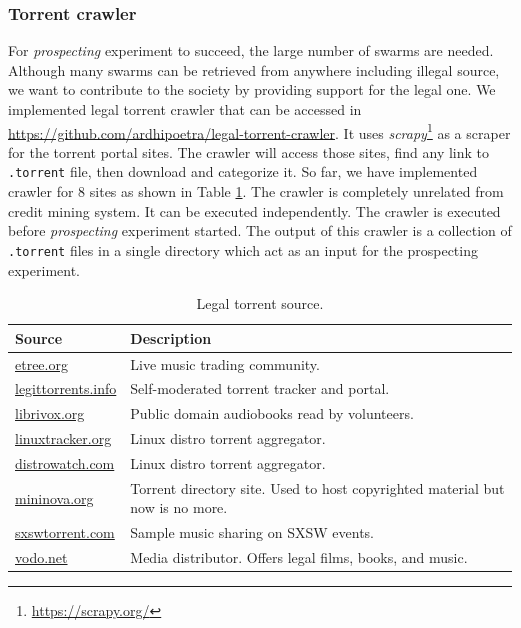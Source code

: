 \subsubsection{Torrent crawler}
For \textit{prospecting} experiment to succeed, the large number of swarms are needed. Although many swarms can be retrieved from anywhere including illegal source, we want to contribute to the society by providing support for the legal one. We implemented legal torrent crawler that can be accessed in \url{https://github.com/ardhipoetra/legal-torrent-crawler}. It uses \textit{scrapy}\footnote{\url{https://scrapy.org/}} as a scraper for the torrent portal sites. The crawler will access those sites, find any link to \texttt{.torrent} file, then download and categorize it. So far, we have implemented crawler for 8 sites as shown in Table \ref{tbl:legaltorrentsource}. The crawler is completely unrelated from credit mining system. It can be executed independently. The crawler is executed before \textit{prospecting} experiment started. The output of this crawler is a collection of \texttt{.torrent} files in a single directory which act as an input for the prospecting experiment.

\begin{table}[h]
	\centering
	\caption{Legal torrent source.}
	\label{tbl:legaltorrentsource}
	\begin{tabular}{lp{8.5cm}}
		\hline
		Source & Description \\ \hline
		\url{etree.org} & Live music trading community. \\
		\url{legittorrents.info} & Self-moderated torrent tracker and portal. \\
		\url{librivox.org} & Public domain audiobooks read by volunteers. \\
		\url{linuxtracker.org} & Linux distro torrent aggregator. \\
		\url{distrowatch.com} & Linux distro torrent aggregator. \\
		\url{mininova.org} & Torrent directory site. Used to host copyrighted material but now is no more.\\
		\url{sxswtorrent.com} & Sample music sharing on SXSW events. \\
		\url{vodo.net} & Media distributor. Offers legal films, books, and music.
	\end{tabular}
\end{table}

%
